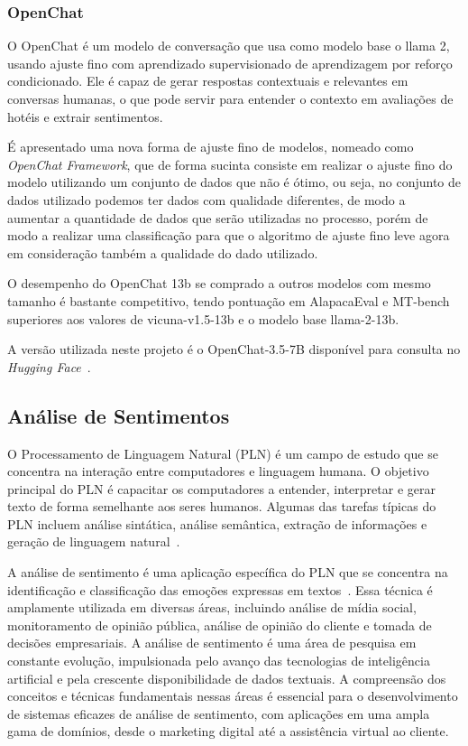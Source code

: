\subsubsection{OpenChat}
\label{cap:fund_teorica:sec:modelos:subsec:openchat}

O OpenChat \cite{wang2024openchat} é um modelo de conversação que usa como modelo base o llama 2, usando ajuste fino com aprendizado supervisionado de aprendizagem por reforço condicionado. Ele é capaz de gerar respostas contextuais e relevantes em conversas humanas, o que pode servir para entender o contexto em avaliações de hotéis e extrair sentimentos.

É apresentado uma nova forma de ajuste fino de modelos, nomeado como \textit{OpenChat Framework}, que de forma sucinta consiste em realizar o ajuste fino do modelo utilizando um conjunto de dados que não é ótimo, ou seja, no conjunto de dados utilizado podemos ter dados com qualidade diferentes, de modo a aumentar a quantidade de dados que serão utilizadas no processo, porém de modo a realizar uma classificação para que o algoritmo de ajuste fino leve agora em consideração também a qualidade do dado utilizado.

O desempenho do OpenChat 13b se comprado a outros modelos com mesmo tamanho é bastante competitivo, tendo pontuação em AlapacaEval e MT-bench superiores aos valores de vicuna-v1.5-13b e o modelo base llama-2-13b.

A versão utilizada neste projeto é o OpenChat-3.5-7B disponível para consulta no \textit{Hugging Face}~\cite{openChat357b}.

\subsection{Análise de Sentimentos}
\label{cap:fund_teorica:sec:analise_sentimento}

O Processamento de Linguagem Natural (PLN) é um campo de estudo que se concentra na interação entre computadores e linguagem humana. O objetivo principal do PLN é capacitar os computadores a entender, interpretar e gerar texto de forma semelhante aos seres humanos. Algumas das tarefas típicas do PLN incluem análise sintática, análise semântica, extração de informações e geração de linguagem natural~\cite{anchieta2021pln}.

A análise de sentimento é uma aplicação específica do PLN que se concentra na identificação e classificação das emoções expressas em textos~\cite{Liu2012}. Essa técnica é amplamente utilizada em diversas áreas, incluindo análise de mídia social, monitoramento de opinião pública, análise de opinião do cliente e tomada de decisões empresariais. A análise de sentimento é uma área de pesquisa em constante evolução, impulsionada pelo avanço das tecnologias de inteligência artificial e pela crescente disponibilidade de dados textuais. A compreensão dos conceitos e técnicas fundamentais nessas áreas é essencial para o desenvolvimento de sistemas eficazes de análise de sentimento, com aplicações em uma ampla gama de domínios, desde o marketing digital até a assistência virtual ao cliente.

